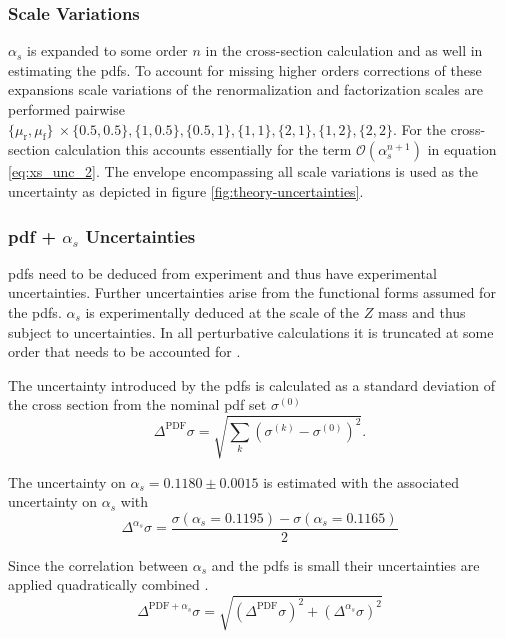 \subsubsection*{Scale Variations}
$\alpha_s$ is expanded to some order $n$ in the cross-section calculation and as well in estimating the \acp{pdf}. To account for missing higher orders corrections of these expansions scale variations of the renormalization and factorization scales are performed pairwise $\{\mu_\text{r},\mu_\text{f}\}\ \times \{0.5,0.5\}, \{1,0.5\}, \{0.5,1\}, \{1,1\}, \{2,1\}, \{1,2\}, \{2,2\}$. For the cross-section calculation this accounts essentially for the term $\mathcal{O}(\alpha_s^{n+1})$ in equation \ref{eq:xs_unc_2}. The envelope encompassing all scale variations is used as the uncertainty as depicted in figure \ref{fig:theory-uncertainties}.


\subsubsection*{\ac{pdf} + $\alpha_s$ Uncertainties}
\acp{pdf} need to be deduced from experiment and thus have experimental uncertainties. Further uncertainties arise from the functional forms assumed for the \acp{pdf}. $\alpha_s$ is  experimentally deduced at the scale of the $Z$ mass and thus subject to uncertainties. In all perturbative calculations it is truncated at some order that needs to be accounted for \citep{unc_recipe,Butterworth_2016}.

The uncertainty introduced by the \acp{pdf} is calculated as a standard deviation of the cross section from the nominal \ac{pdf} set $\sigma^{(0)}$ \citep{Butterworth_2016}
\begin{equation}
    \Delta^\text{PDF}\sigma = \sqrt{\sum_k \left(\sigma^{(k)} - \sigma^{(0)}\right)^2}.
\end{equation}

The uncertainty on $\alpha_s=0.1180\pm0.0015$ is estimated with the associated uncertainty on $\alpha_s$ with
\begin{equation}
    \Delta^{\alpha_s}\sigma = \frac{\sigma(\alpha_s=0.1195)-\sigma(\alpha_s=0.1165)}{2}
\end{equation}

Since the correlation between $\alpha_s$ and the \acp{pdf} is small their uncertainties are applied quadratically combined \citep{unc_recipe,Butterworth_2016}.
\begin{equation}
    \Delta^{\text{PDF}+\alpha_s}\sigma=\sqrt{(\Delta^\text{PDF}\sigma )^2+(\Delta^{\alpha_s}\sigma)^2}
\end{equation}


